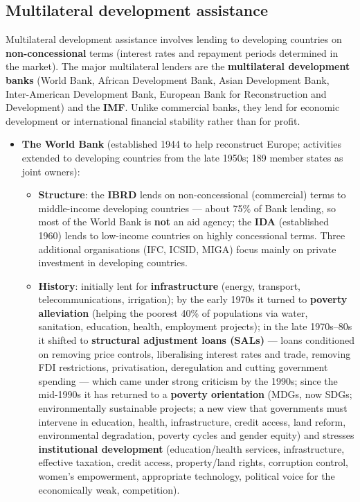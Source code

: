 \documentclass[a4paper,12pt]{article}
\begin{document}
\subsection{Multilateral development assistance}
Multilateral development assistance involves lending to developing countries on \textbf{non-concessional} terms (interest rates and repayment periods determined in the market). The major multilateral lenders are the \textbf{multilateral development banks} (World Bank, African Development Bank, Asian Development Bank, Inter-American Development Bank, European Bank for Reconstruction and Development) and the \textbf{IMF}. Unlike commercial banks, they lend for economic development or international financial stability rather than for profit.
\begin{itemize}
  \item \textbf{The World Bank} (established 1944 to help reconstruct Europe; activities extended to developing countries from the late 1950s; 189 member states as joint owners):
  \begin{itemize}
    \item \textbf{Structure}: the \textbf{IBRD} lends on non-concessional (commercial) terms to middle-income developing countries --- about 75\% of Bank lending, so most of the World Bank is \textbf{not} an aid agency; the \textbf{IDA} (established 1960) lends to low-income countries on highly concessional terms. Three additional organisations (IFC, ICSID, MIGA) focus mainly on private investment in developing countries.
    \item \textbf{History}: initially lent for \textbf{infrastructure} (energy, transport, telecommunications, irrigation); by the early 1970s it turned to \textbf{poverty alleviation} (helping the poorest 40\% of populations via water, sanitation, education, health, employment projects); in the late 1970s--80s it shifted to \textbf{structural adjustment loans (SALs)} --- loans conditioned on removing price controls, liberalising interest rates and trade, removing FDI restrictions, privatisation, deregulation and cutting government spending --- which came under strong criticism by the 1990s; since the mid-1990s it has returned to a \textbf{poverty orientation} (MDGs, now SDGs; environmentally sustainable projects; a new view that governments must intervene in education, health, infrastructure, credit access, land reform, environmental degradation, poverty cycles and gender equity) and stresses \textbf{institutional development} (education/health services, infrastructure, effective taxation, credit access, property/land rights, corruption control, women's empowerment, appropriate technology, political voice for the economically weak, competition).

\end{itemize}
\end{itemize}
\end{document}
